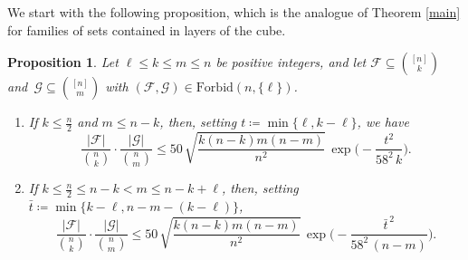 \documentclass[10pt,a4paper]{amsart}
\newtheorem{prop}[thm]{Proposition}
\theoremstyle{remark}
\newcommand{\mik}{\leqslant}
\newcommand{\Fcal}{\mathcal{F}}
\newcommand{\Gcal}{\mathcal{G}}
\begin{document}
We start with the following proposition, which is the analogue of Theorem \ref{main} for families
of sets contained in layers of the cube.
\begin{prop} \label{p7.1}
Let $\ell\mik k\mik m\mik n$ be positive integers, and let $\Fcal\subseteq\binom{[n]}{k}$
and\, $\Gcal\subseteq\binom{[n]}{m}$ with $(\Fcal,\Gcal)\in\mathrm{Forbid}(n,\{\ell\})$.
\begin{enumerate}
\item[(i)] If $k\mik \frac{n}{2}$ and $m\mik n-k$, then, setting
$t\coloneqq \min\{\ell,k-\ell\}$, we have
\begin{equation} \label{e7.1}
\frac{|\Fcal|}{\binom{n}{k}}\cdot \frac{|\Gcal|}{\binom{n}{m}} \mik 50\,
\sqrt{\frac{k(n-k)m(n-m)}{n^2}}\, \exp\Big(-\frac{t^2}{58^2\,k}\Big).
\end{equation}
\item[(ii)] If $k\mik \frac{n}{2}\mik n-k< m\mik n-k+\ell$, then, setting
$\bar{t}\coloneqq \min\{k-\ell,n-m-(k-\ell)\}$,
\begin{equation} \label{e7.2}
\frac{|\Fcal|}{\binom{n}{k}}\cdot \frac{|\Gcal|}{\binom{n}{m}} \mik 50\,
\sqrt{\frac{k(n-k)m(n-m)}{n^2}}\, \exp\Big(-\frac{\bar{t}^{\,2}}{58^2\, (n-m)}\Big).
\end{equation}
\end{enumerate}
\end{prop}
\end{document}
